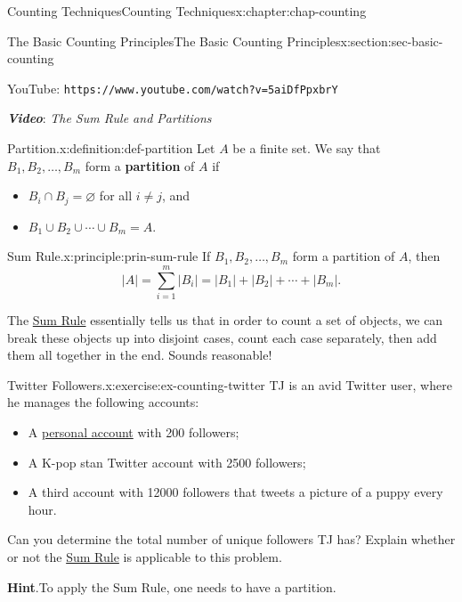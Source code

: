 \documentclass[oneside,10pt,]{book}
\newcommand{\blocktitlefont}{\relax}
\newcommand{\mono}[1]{\texttt{#1}}
\newcommand{\alert}[1]{\textbf{\textit{#1}}}
\newcommand{\terminology}[1]{\textbf{#1}}
\numberwithin{equation}{section}
\begin{document}
\begin{chapterptx}{Counting Techniques}{}{Counting Techniques}{}{}{x:chapter:chap-counting}
\begin{sectionptx}{The Basic Counting Principles}{}{The Basic Counting Principles}{}{}{x:section:sec-basic-counting}
\begin{sidebyside}{1}{0}{0}{0}
\begin{sbspanel}{1}
\begin{tcbraster}[raster columns=2, raster column skip=1pt, raster halign=center, raster force size=false, raster left skip=0pt, raster right skip=0pt]
\begin{tcolorbox}[captionstyle]%
\small YouTube: \mono{https://www.youtube.com/watch?v=5aiDfPpxbrY}\end{tcolorbox}%
\end{tcbraster}%
\end{sbspanel}%
\end{sidebyside}%
\par
\alert{Video}: \emph{The Sum Rule and Partitions}%
\begin{definition}{Partition.}{x:definition:def-partition}%
Let \(A\) be a finite set. We say that \(B_1,B_2,\ldots,B_m\) form a \terminology{partition} of \(A\) if%
\begin{itemize}[label=\textbullet]
\item{}\(B_i \cap B_j = \varnothing\) for all \(i \ne j\), and%
\item{}\(B_1 \cup B_2 \cup \cdots \cup B_m = A\).%
\end{itemize}
%
\end{definition}
\begin{principle}{Sum Rule.}{}{x:principle:prin-sum-rule}%
If \(B_1,B_2,\ldots,B_m\) form a partition of \(A\), then%
\begin{equation*}
|A| = \sum_{i=1}^m |B_i| = |B_1| + |B_2| + \cdots + |B_m|\text{.}
\end{equation*}
%
\end{principle}
The \hyperref[x:principle:prin-sum-rule]{Sum Rule} essentially tells us that in order to count a set of objects, we can break these objects up into disjoint cases, count each case separately, then add them all together in the end. Sounds reasonable!%
\begin{inlineexercise}{Twitter Followers.}{x:exercise:ex-counting-twitter}%
TJ is an avid Twitter user, where he manages the following accounts:%
\begin{itemize}[label=\textbullet]
\item{}A \href{https://twitter.com/tjyusun}{personal account} with 200 followers;%
\item{}A K-pop stan Twitter account with 2500 followers;%
\item{}A third account with 12000 followers that tweets a picture of a puppy every hour.%
\end{itemize}
Can you determine the total number of unique followers TJ has? Explain whether or not the \hyperref[x:principle:prin-sum-rule]{Sum Rule} is applicable to this problem.%
\par\smallskip%
\noindent\textbf{\blocktitlefont Hint}.\hypertarget{g:hint:id464665}{}\quad{}To apply the Sum Rule, one needs to have a partition.%

\end{inlineexercise}
\end{sectionptx}
\end{chapterptx}
\end{document}
